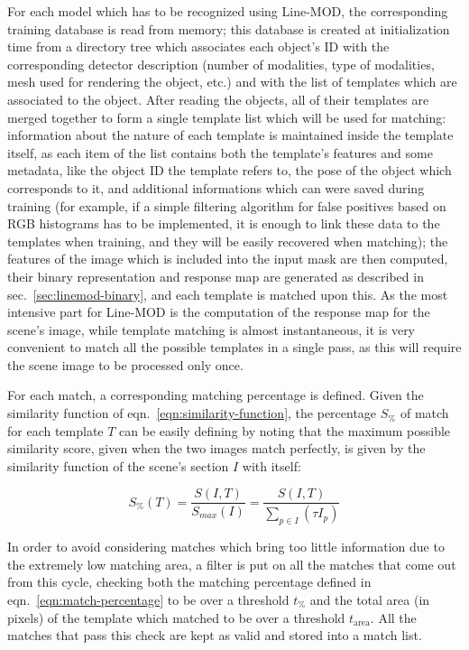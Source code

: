 For each model which has to be recognized using Line-MOD, the
corresponding training database is read from memory; this database
is created at initialization time from a directory tree which
associates each object's ID with the corresponding detector
description (number of modalities, type of modalities, mesh used for
rendering the object, etc.) and with the list of templates which are
associated to the object. After reading the objects, all of their
templates are merged together to form a single template list which
will be used for matching: information about the nature of each
template is maintained inside the template itself, as each item of the
list contains both the template's features and some metadata, like the
object ID the template refers to, the pose of the object which
corresponds to it, and additional informations which can were saved
during training (for example, if a simple filtering algorithm for false
positives  based on RGB histograms has to be implemented, it is enough
to link these data to the templates when training, and they will be
easily recovered when matching); the features of the image which is
included into the input mask are then computed, their binary
representation and response map are generated as described in
sec.~\ref{sec:linemod-binary}, and each template is matched upon
this. As the most intensive part for Line-MOD is the computation of
the response map for the scene's image, while template matching is
almost instantaneous, it is very convenient to match all the possible
templates in a single pass, as this will require the scene image to be
processed only once.

For each match, a corresponding matching percentage is defined. Given
the similarity function of eqn.~\ref{eqn:similarity-function}, the
percentage $S_\%$ of match for each template $T$ can be easily defining by noting
that the maximum possible similarity score, given when the two
images match perfectly, is given by the similarity function of the
scene's section $I$ with itself:

\begin{equation} \label{eqn:match-percentage}
  S_\%(T) = \frac{S(I,T)}{S_{max}(I)} = \frac{S(I,T)}{\sum_{p \in I}
    \left( \tau I_{p} \right)}
\end{equation}

In order to avoid considering matches which bring too little
information due to the extremely low matching area, a filter is put on
all the matches that come out from this cycle, checking both the
matching percentage defined in eqn.~\ref{eqn:match-percentage} to be over
a threshold $t_\%$ and the total area (in pixels) of the template
which matched to be over a threshold $t_{\text{area}}$. All the
matches that pass this check are kept as valid and stored into a
match list.

